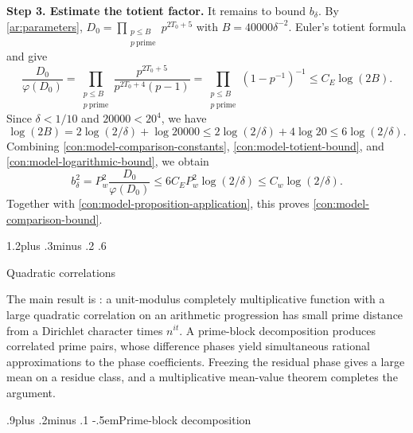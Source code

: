 \documentclass[twoside]{aomart}
\makeatletter
\theoremstyle{paperplain}
\theoremstyle{paperdefinition}
\renewcommand\section{\@startsection{section}{1}{\z@}
  {1.2\baselineskip plus .3\baselineskip minus .2\baselineskip}
  {.6\baselineskip}{\normalfont\large\bfseries\raggedright}}
\renewcommand\subsection{\@startsection{subsection}{2}{\z@}
  {.9\baselineskip plus .2\baselineskip minus .1\baselineskip}
  {-.5em}{\normalfont\bfseries}}
\renewenvironment{proof}[1][\proofname]{\par\pushQED{\qed}%
  \normalfont\topsep6\p@\@plus3\p@\relax\trivlist
  \item[\hskip\labelsep\itshape #1\@addpunct{.}]\ignorespaces
}{\popQED\endtrivlist\@endpefalse}
\numberwithin{equation}{section}
\makeatother
\begin{document}
\begin{proof}
\medskip
\noindent\textbf{Step 3. Estimate the totient factor.}
It remains to bound $b_\delta$.
By \eqref{ar:parameters},
$\displaystyle D_0=\prod_{\substack{p\le B\\p\ \mathrm{prime}}}p^{2T_0+5}$ with $B=40000\delta^{-2}$.
Euler's totient formula and  give
\begin{equation}
 \frac{D_0}{\varphi(D_0)}
 =\prod_{\substack{p\le B\\p\ \mathrm{prime}}}\frac{p^{2T_0+5}}{p^{2T_0+4}(p-1)}
 =\prod_{\substack{p\le B\\p\ \mathrm{prime}}}(1-p^{-1})^{-1}
 \le C_E\log(2B).
 \label{con:model-totient-bound}
\end{equation}
Since $\delta<1/10$ and $20000<20^4$, we have
\begin{equation}
 \log(2B)=2\log(2/\delta)+\log20000
 \le2\log(2/\delta)+4\log20\le6\log(2/\delta).
 \label{con:model-logarithmic-bound}
\end{equation}
Combining \eqref{con:model-comparison-constants},
\eqref{con:model-totient-bound}, and \eqref{con:model-logarithmic-bound},
we obtain
\begin{equation*}
 b_\delta^2
 =P_w^2\frac{D_0}{\varphi(D_0)}
 \le6C_EP_w^2\log(2/\delta)
 \le C_w\log(2/\delta).
\end{equation*}
Together with \eqref{con:model-proposition-application}, this proves
\eqref{con:model-comparison-bound}.
\end{proof}

\section{Quadratic correlations}
\label{sec:scalar}

The main result is : a unit-modulus
completely multiplicative function with a large quadratic correlation
on an arithmetic progression has small prime distance from a
Dirichlet character times $n^{it}$. A prime-block decomposition
produces correlated prime pairs, whose difference phases yield
simultaneous rational approximations to the phase coefficients.
Freezing the residual phase gives a large mean on a residue class,
and a multiplicative mean-value theorem completes the argument.

\subsection{Prime-block decomposition}
\end{document}
